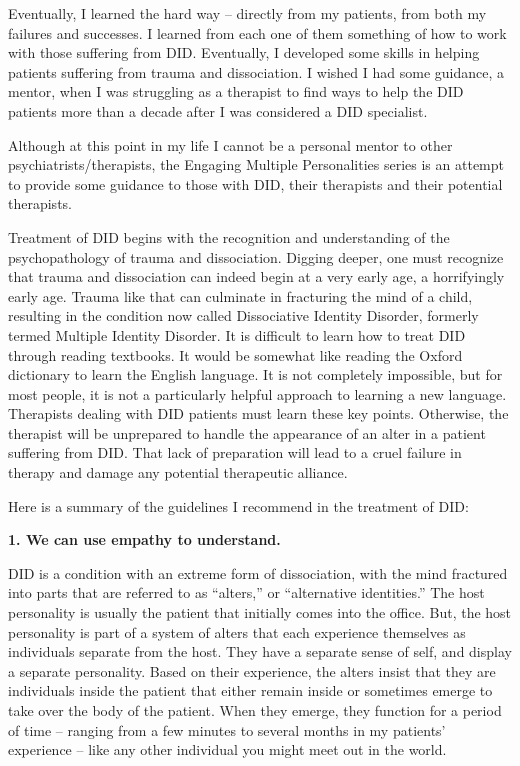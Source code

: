 \documentclass[]{book}
\begin{document}
Eventually, I learned the hard way -- directly from my patients, from both my failures and successes. I learned from each one of them something of how to work with those suffering from DID. Eventually, I developed some skills in helping patients suffering from trauma and dissociation. I wished I had some guidance, a mentor, when I was struggling as a therapist to find ways to help the DID patients more than a decade after I was considered a DID specialist.

Although at this point in my life I cannot be a personal mentor to other psychiatrists/therapists, the Engaging Multiple Personalities series is an attempt to provide some guidance to those with DID, their therapists and their potential therapists.

Treatment of DID begins with the recognition and understanding of the psychopathology of trauma and dissociation. Digging deeper, one must recognize that trauma and dissociation can indeed begin at a very early age, a horrifyingly early age. Trauma like that can culminate in fracturing the mind of a child, resulting in the condition now called Dissociative Identity Disorder, formerly termed Multiple Identity Disorder. It is difficult to learn how to treat DID through reading textbooks. It would be somewhat like reading the Oxford dictionary to learn the English language. It is not completely impossible, but for most people, it is not a particularly helpful approach to learning a new language. Therapists dealing with DID patients must learn these key points. Otherwise, the therapist will be unprepared to handle the appearance of an alter in a patient suffering from DID. That lack of preparation will lead to a cruel failure in therapy and damage any potential therapeutic alliance.

Here is a summary of the guidelines I recommend in the treatment of DID:

\textbf{1. We can use empathy to understand.}

DID is a condition with an extreme form of dissociation, with the mind fractured into parts that are referred to as ``alters,'' or ``alternative identities.'' The host personality is usually the patient that initially comes into the office. But, the host personality is part of a system of alters that each experience themselves as individuals separate from the host. They have a separate sense of self, and display a separate personality. Based on their experience, the alters insist that they are individuals inside the patient that either remain inside or sometimes emerge to take over the body of the patient. When they emerge, they function for a period of time -- ranging from a few minutes to several months in my patients' experience -- like any other individual you might meet out in the world.
\end{document}
